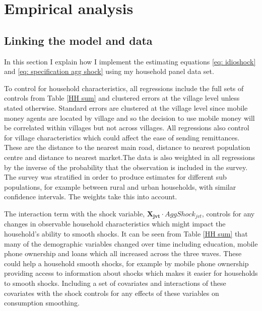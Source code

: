 \newpage
\section{Empirical analysis}
\subsection{Linking the model and data}
In this section I explain how I implement the estimating equations \eqref{eq: idioshock} and \eqref{eq: specification agg shock} using my household panel data set. 

To control for household characteristics, all regressions include the full sets of controls from Table \ref{HH sum} and clustered errors at the village level unless stated otherwise. Standard errors are clustered at the village level since mobile money agents are located by village and so the decision to use mobile money will be correlated within villages but not across villages. All regressions also control for village characteristics which could affect the ease of sending remittances. These are the distance to the nearest main road, distance to nearest population centre and distance to nearest market.The data is also weighted in all regressions by the inverse of the probability that the observation is included in the survey. The survey was stratified in order to produce estimates for different sub populations, for example between rural and urban households, with similar confidence intervals. The weights take this into account.

The interaction term with the shock variable, $\bm{X_{jvt}} \cdot AggShock_{jvt}$, controls for any changes in observable household characteristics which might impact the household's ability to smooth shocks. It can be seen from Table \ref{HH sum} that many of the demographic variables changed over time including education, mobile phone ownership and loans which all increased across the three waves. These could help a household smooth shocks, for example by mobile phone ownership providing access to information about shocks which makes it easier for households to smooth shocks. Including a set of covariates and interactions of these covariates with the shock controls for any effects of these variables on consumption smoothing.  

